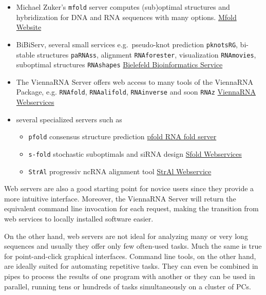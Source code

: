 \documentclass[a4paper]{article}
\begin{document}
\begin{itemize}
\item Michael Zuker's \texttt{mfold} server computes (sub)optimal structures
  and hybridization for DNA and RNA sequences with many options.\newline
  \href{http://mfold.rna.albany.edu/?q=mfold}{Mfold Website}
\item BiBiServ, several small services e.g.\ pseudo-knot prediction
  \texttt{pknotsRG}, bi-stable structures \texttt{paRNAss}, alignment
  \texttt{RNAforester}, visualization \texttt{RNAmovies}, suboptimal
  structures \texttt{RNAshapes}\newline
  \href{https://bibiserv.cebitec.uni-bielefeld.de/rna}{Bielefeld Bioinformatics Service}
\item The ViennaRNA Server offers web access to many tools of the ViennaRNA
Package, e.g. \texttt{RNAfold}, \texttt{RNAalifold}, \texttt{RNAinverse} and soon
  \texttt{RNAz}\newline
  \href{http://rna.tbi.univie.ac.at/}{ViennaRNA Webservices}
\item several specialized servers such as \newline
\begin{itemize}
  \item \texttt{pfold} consensus structure prediction\newline
  \href{http://www.daimi.au.dk/~compbio/rnafold/}{ pfold RNA fold server}\newline
  \item \texttt{s-fold} stochastic suboptimals and siRNA design \newline
  \href{http://sfold.wadsworth.org/}{Sfold Webservices}\newline
  \item \texttt{StrAl} progressiv ncRNA alignment tool\newline
  \href{http://www.biophys.uni-duesseldorf.de/stral/}{StrAl Webservice}
\end{itemize}
\end{itemize}

Web servers are also a good starting point for novice users since they
provide a more intuitive interface. Moreover, the ViennaRNA Server will
return the equivalent command line invocation for each request, making the
transition from web services to locally installed software easier.

On the other hand, web servers are not ideal for analyzing many or very long
sequences and usually they offer only few often-used tasks.
Much the same is true for point-and-click graphical interfaces.
Command line tools, on the other hand, are ideally suited for automating
repetitive tasks. They can even be combined in pipes to process the
results of one program with another or they can be used in parallel, running
tens or hundreds of tasks simultaneously on a cluster of PCs.
\end{document}

